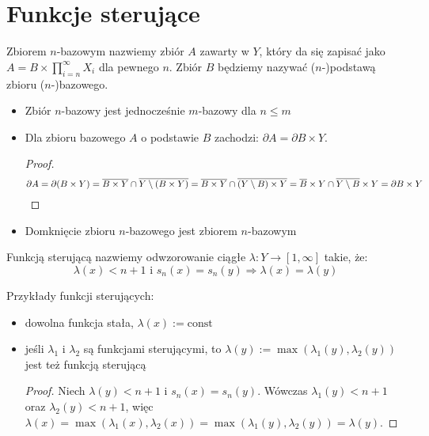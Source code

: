 




\section{Funkcje sterujące}
\begin{df}
Zbiorem $n$-bazowym nazwiemy zbiór $A$ zawarty w $Y$, który da się zapisać jako $A = B \times \prod_{i=n}^\infty X_i$ dla pewnego $n$. Zbiór $B$ będziemy nazywać ($n$-)podstawą zbioru ($n$-)bazowego.
\end{df}


\begin{note}
\begin{itemize}
  \item Zbiór $n$-bazowy jest jednocześnie $m$-bazowy dla $n \leq m$
  \item Dla zbioru bazowego $A$ o podstawie $B$ zachodzi: $\partial A = \partial B \times Y$.
  \begin{proof}
    $$\partial A = \partial(B \times Y) = \overline{B \times Y} \cap \overline{Y \setminus (B \times Y)} = \overline{B \times Y} \cap \overline{(Y \setminus B) \times Y} = \overline{B} \times Y \cap \overline{Y \setminus B} \times Y = \partial{B} \times Y$$
  \end{proof}
  \item Domknięcie zbioru $n$-bazowego jest zbiorem $n$-bazowym
\end{itemize}

\end{note}


\begin{df}
Funkcją sterującą nazwiemy odwzorowanie ciągłe $\lambda: Y \rightarrow [1,\infty]$ takie, że:
$$\lambda(x) < n+1 \mbox{ i } s_n(x) = s_n(y) \Rightarrow \lambda(x) = \lambda(y)$$
\end{df}

\begin{note}
Przykłady funkcji sterujących:
  \begin{itemize}
    \item dowolna funkcja stała, $\lambda(x) := \mbox{const}$
    \item jeśli $\lambda_1$ i $\lambda_2$ są funkcjami sterującymi, to $\lambda(y) := \max(\lambda_1(y), \lambda_2(y))$ jest też funkcją sterującą
  \begin{proof}
    Niech $\lambda(y) < n+1$ i $s_n(x) = s_n(y)$. Wówczas $\lambda_1(y) < n+1$ oraz $\lambda_2(y) < n+1$, więc $\lambda(x) = \max(\lambda_1(x), \lambda_2(x)) = \max(\lambda_1(y), \lambda_2(y)) = \lambda(y)$.
  \end{proof}
  \end{itemize}
\end{note}


